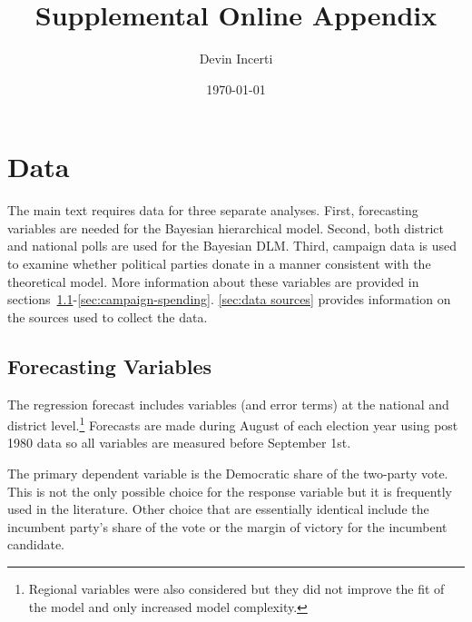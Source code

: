 \documentclass[12pt,final,fleqn]{article}
\theoremstyle{plain}
\begin{document}
\author{Devin Incerti}
\title{\textbf{Supplemental Online Appendix}}
\date{\today}
\maketitle

\tableofcontents
\listoffigures
\listoftables

\clearpage
\doublespacing

\section{Data}
The main text requires data for three separate analyses. First, forecasting variables are needed for the Bayesian hierarchical model. Second, both district and national polls are used for the Bayesian DLM. Third, campaign data is used to examine whether political parties donate in a manner consistent with the theoretical model. More information about these variables are provided in sections~\ref{sec:forecast-vars}-\ref{sec:campaign-spending}. \autoref{sec:data sources} provides information on the sources used to collect the data.

\subsection{Forecasting Variables} \label{sec:forecast-vars}
The regression forecast includes variables (and error terms) at the national and district level.\footnote{Regional variables were also considered but they did not improve the fit of the model and only increased model complexity.} Forecasts are made during August of each election year using post 1980 data so all variables are measured before September 1st.

The primary dependent variable is the Democratic share of the two-party vote. This is not the only possible choice for the response variable but it is frequently used in the literature. Other choice that are essentially identical include the incumbent party's share of the vote or the margin of victory for the incumbent candidate.
\end{document}
